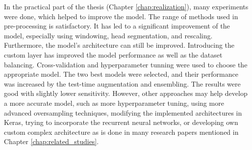 \documentclass[thesis=B,english]{FITthesis}[2019/12/23]
\begin{document}
In the practical part of the thesis (Chapter \ref{chap:realization}), many experiments were done, which helped to improve the model. The range of methods used in pre-processing is satisfactory. It has led to a significant improvement of the model, especially using windowing, head segmentation, and rescaling. Furthermore, the model's architecture can still be improved. Introducing the custom layer has improved the model performance as well as the dataset balancing.  Cross-validation and hyperparameter tunning were used to choose the appropriate model. The two best models were selected, and their performance was increased by the test-time augmentation and ensembling. The results were good with slightly lower sensitivity. However, other approaches may help develop a more accurate model, such as more hyperparameter tuning, using more advanced oversampling techniques, modifying the implemented architectures in Keras, trying to incorporate the recurrent neural networks, or developing own custom complex architecture as is done in many research papers mentioned in Chapter \ref{chap:related_studies}. 




\appendix
\end{document}
